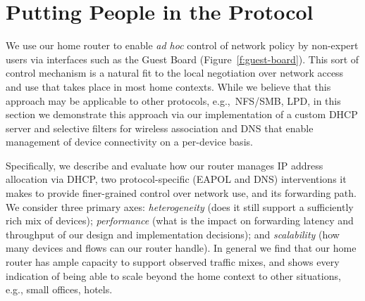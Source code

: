 \section{Putting People in the Protocol}
\label{s:protocols}

We use our home router to enable \emph{ad hoc} control of network
policy by non-expert users via interfaces such as the Guest Board
(Figure~\ref{f:guest-board}).  This sort of control mechanism is a
natural fit to the local negotiation over network access and
use that takes place in most home contexts.  While we believe that
this approach may be applicable to other protocols, e.g.,~NFS/SMB,
LPD, in this section we demonstrate this approach via our
implementation of a custom DHCP server and selective filters for
wireless association and DNS that enable management of device
connectivity on a per-device basis. 

Specifically, we describe and evaluate how our router manages IP address
allocation via DHCP, two protocol-specific (EAPOL and DNS)
interventions it makes to provide finer-grained control over network
use, and its forwarding path.  We consider three primary axes: 
\emph{heterogeneity} (does it still support a sufficiently rich mix of
devices); \emph{performance} (what is the impact on forwarding latency
and throughput of our design and implementation decisions); and
\emph{scalability} (how many devices and flows can our router handle).
In general we find that our home router has ample capacity to support
observed traffic mixes, and shows every indication of being
able to scale beyond the home context to other situations, e.g., small
offices, hotels. 





